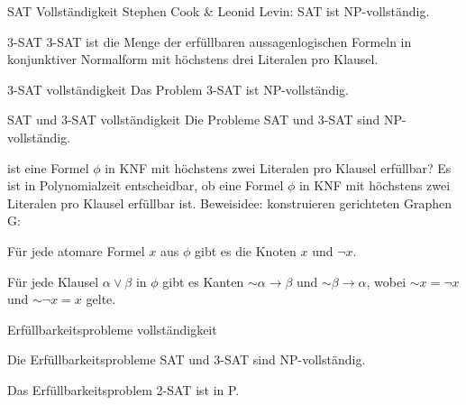 \documentclass[avery5371, frame]{flashcards}
\begin{document}
\begin{flashcard}[Satz]{SAT Vollständigkeit}
    Stephen Cook \& Leonid Levin: SAT ist NP-vollständig.
\end{flashcard}

\begin{flashcard}[Definition]{3-SAT}
    3-SAT ist die Menge der erfüllbaren aussagenlogischen Formeln in konjunktiver Normalform mit höchstens drei Literalen pro Klausel.
\end{flashcard}

\begin{flashcard}[Satz]{3-SAT vollständigkeit}
    Das Problem 3-SAT ist NP-vollständig.
\end{flashcard}

\begin{flashcard}[Satz]{SAT und 3-SAT vollständigkeit}
    Die Probleme SAT und 3-SAT sind NP-vollständig.
\end{flashcard}

\begin{flashcard}[Satz]{ist eine Formel $\phi$ in KNF mit höchstens zwei Literalen pro Klausel erfüllbar?}
    Es ist in Polynomialzeit entscheidbar, ob eine Formel $\phi$ in KNF mit höchstens zwei Literalen pro Klausel erfüllbar ist.
    Beweisidee: konstruieren gerichteten Graphen G:
    \begin{itemize*}
        \item Für jede atomare Formel $x$ aus $\phi$ gibt es die Knoten $x$ und $\neg x$.
        \item Für jede Klausel $\alpha\vee\beta$ in $\phi$ gibt es Kanten $\sim\alpha\rightarrow\beta$ und $\sim\beta\rightarrow\alpha$, wobei $\sim x =\neg x$ und $\sim\neg x=x$ gelte.
    \end{itemize*}
\end{flashcard}

\begin{flashcard}[Satz]{Erfüllbarkeitsprobleme vollständigkeit}
    \begin{itemize*}
        \item Die Erfüllbarkeitsprobleme SAT und 3-SAT sind NP-vollständig.
        \item Das Erfüllbarkeitsproblem 2-SAT ist in P.
    \end{itemize*}
\end{flashcard}
\end{document}
